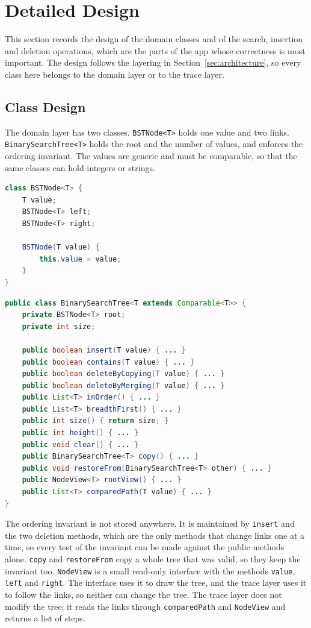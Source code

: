 \section{Detailed Design}\label{sec:design}


This section records the design of the domain classes and of the search, insertion and deletion operations, which are the parts of the app whose correctness is most important. The design follows the layering in Section~\ref{sec:architecture}, so every class here belongs to the domain layer or to the trace layer.

\subsection{Class Design}
The domain layer has two classes. \texttt{BSTNode<T>} holds one value and two links. \texttt{BinarySearchTree<T>} holds the root and the number of values, and enforces the ordering invariant. The values are generic and must be comparable, so that the same classes can hold integers or strings.

\begin{lstlisting}[language=Java]
class BSTNode<T> {
    T value;
    BSTNode<T> left;
    BSTNode<T> right;

    BSTNode(T value) {
        this.value = value;
    }
}
\end{lstlisting}

\begin{lstlisting}[language=Java]
public class BinarySearchTree<T extends Comparable<T>> {
    private BSTNode<T> root;
    private int size;

    public boolean insert(T value) { ... }
    public boolean contains(T value) { ... }
    public boolean deleteByCopying(T value) { ... }
    public boolean deleteByMerging(T value) { ... }
    public List<T> inOrder() { ... }
    public List<T> breadthFirst() { ... }
    public int size() { return size; }
    public int height() { ... }
    public void clear() { ... }
    public BinarySearchTree<T> copy() { ... }
    public void restoreFrom(BinarySearchTree<T> other) { ... }
    public NodeView<T> rootView() { ... }
    public List<T> comparedPath(T value) { ... }
}
\end{lstlisting}

The ordering invariant is not stored anywhere. It is maintained by \texttt{insert} and the two deletion methods, which are the only methods that change links one at a time, so every test of the invariant can be made against the public methods alone. \texttt{copy} and \texttt{restoreFrom} copy a whole tree that was valid, so they keep the invariant too. \texttt{NodeView} is a small read-only interface with the methods \texttt{value}, \texttt{left} and \texttt{right}. The interface uses it to draw the tree, and the trace layer uses it to follow the links, so neither can change the tree. The trace layer does not modify the tree; it reads the links through \texttt{comparedPath} and \texttt{NodeView} and returns a list of steps.

